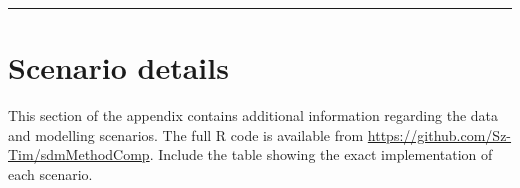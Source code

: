 \documentclass[]{article}
\begin{document}
\begin{center}\rule{0.5\linewidth}{\linethickness}\end{center}

\newpage
\section{Scenario details}

This section of the appendix contains additional information regarding
the data and modelling scenarios. The full R code is available from
\url{https://github.com/Sz-Tim/sdmMethodComp}. Include the table showing
the exact implementation of each scenario.
\end{document}
